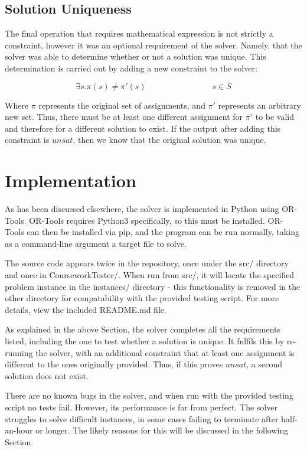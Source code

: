 \documentclass[11pt]{article}
\begin{document}
		\subsection{Solution Uniqueness}

			The final operation that requires mathematical expression is not strictly a constraint,
			however it was an optional requirement of the solver.
			Namely, that the solver was able to determine whether or not a solution was unique.
			This determination is carried out by adding a new constraint to the solver:

			\begin{equation}
				\exists s. \pi(s) \neq \pi'(s) \qquad \qquad \qquad \qquad s \in S
			\end{equation}

			Where \(\pi\) represents the original set of assignments, and \(\pi'\) represents an arbitrary new set.
			Thus, there must be at least one different assignment for \(\pi'\) to be valid and therefore
			for a different solution to exist. If the output after adding this constraint is \(unsat\),
			then we know that the original solution was unique.

	\section{Implementation}

		As has been discussed elsewhere, the solver is implemented in Python using OR-Tools.
		OR-Tools requires Python3 specifically, so this must be installed.
		OR-Tools can then be installed via pip, and the program can be run normally,
		taking as a command-line argument a target file to solve.

		The source code appears twice in the repository,
		once under the src/ directory and once in CourseworkTester/.
		When run from src/, it will locate the specified problem instance in the instances/ directory -
		this functionality is removed in the other directory for compatability with the provided testing script.
		For more details, view the included README.md file.

		As explained in the above Section, the solver completes all the requirements listed, including the one to test whether a solution is unique.
		It fulfils this by re-running the solver, with an additional constraint that at least one assignment is different to the ones originally provided.
		Thus, if this proves \(unsat\), a second solution does not exist.

		There are no known bugs in the solver, and when run with the provided testing script no tests fail.
		However, its performance is far from perfect.
		The solver struggles to solve difficult instances, in some cases failing to terminate after half-an-hour or longer.
		The likely reasons for this will be discussed in the following Section.
\end{document}

